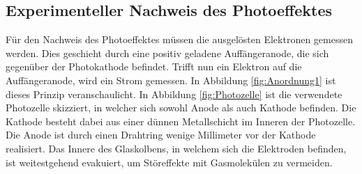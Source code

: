 \subsection{Experimenteller Nachweis des Photoeffektes}
\label{sec:nachweis}
Für den Nachweis des Photoeffektes müssen die ausgelösten Elektronen gemessen werden. Dies geschieht durch eine positiv geladene
Auffängeranode, die sich gegenüber der Photokathode befindet. Trifft nun ein Elektron auf die Auffängeranode, wird ein Strom
gemessen. In Abbildung \ref{fig:Anordnung1} ist dieses Prinzip veranschaulicht. In Abbildung \ref{fig:Photozelle} ist
die verwendete Photozelle skizziert, in welcher sich sowohl Anode als auch Kathode befinden. Die Kathode besteht dabei aus einer dünnen
Metallschicht im Inneren der Photozelle. Die Anode ist durch einen Drahtring wenige Millimeter vor der Kathode realisiert. Das Innere des
Glaskolbens, in welchem sich die Elektroden befinden, ist weitestgehend evakuiert, um Störeffekte mit Gasmolekülen zu vermeiden.


